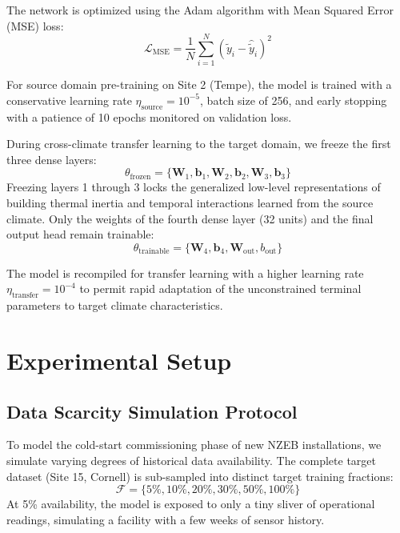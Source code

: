 \documentclass[conference]{IEEEtran}
\begin{document}
The network is optimized using the Adam algorithm with Mean Squared Error (MSE) loss:
\begin{equation}
\mathcal{L}_{\text{MSE}} = \frac{1}{N} \sum_{i=1}^{N} (\tilde{y}_i - \hat{\tilde{y}}_i)^2
\label{eq_mse}
\end{equation}

For source domain pre-training on Site 2 (Tempe), the model is trained with a conservative learning rate $\eta_{\text{source}} = 10^{-5}$, batch size of 256, and early stopping with a patience of 10 epochs monitored on validation loss.

During cross-climate transfer learning to the target domain, we freeze the first three dense layers:
\begin{equation}
\theta_{\text{frozen}} = \{\mathbf{W}_1, \mathbf{b}_1, \mathbf{W}_2, \mathbf{b}_2, \mathbf{W}_3, \mathbf{b}_3\}
\label{eq_frozen}
\end{equation}
Freezing layers 1 through 3 locks the generalized low-level representations of building thermal inertia and temporal interactions learned from the source climate. Only the weights of the fourth dense layer (32 units) and the final output head remain trainable:
\begin{equation}
\theta_{\text{trainable}} = \{\mathbf{W}_4, \mathbf{b}_4, \mathbf{W}_{\text{out}}, b_{\text{out}}\}
\label{eq_trainable}
\end{equation}

The model is recompiled for transfer learning with a higher learning rate $\eta_{\text{transfer}} = 10^{-4}$ to permit rapid adaptation of the unconstrained terminal parameters to target climate characteristics.

\section{Experimental Setup}
\subsection{Data Scarcity Simulation Protocol}
To model the cold-start commissioning phase of new NZEB installations, we simulate varying degrees of historical data availability. The complete target dataset (Site 15, Cornell) is sub-sampled into distinct target training fractions:
\begin{equation}
\mathcal{F} = \{5\%, 10\%, 20\%, 30\%, 50\%, 100\%\}
\label{eq_fractions}
\end{equation}
At 5\% availability, the model is exposed to only a tiny sliver of operational readings, simulating a facility with a few weeks of sensor history.
\end{document}
